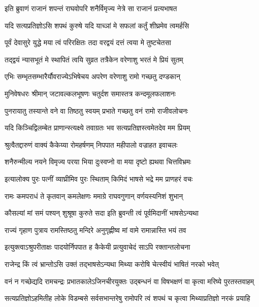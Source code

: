 \twolineshloka
{इति ब्रुवाणं राजानं शपन्तं राघवोपरि}
{शनैर्विमृज्य नेत्रे सा राजानं प्रत्यभाषत} %

\twolineshloka
{यदि सत्यप्रतिज्ञोऽसि शपथं कुरुषे यदि}
{याच्ञां मे सफलां कर्तुं शीघ्रमेव त्वमर्हसि} %

\twolineshloka
{पूर्वं देवासुरे युद्धे मया त्वं परिरक्षितः}
{तदा वरद्वयं दत्तं त्वया मे तुष्टचेतसा} %

\twolineshloka
{तद्द्वयं न्यासभूतं मे स्थापितं त्वयि सुव्रत}
{तत्रैकेन वरेणाशु भरतं मे प्रियं सुतम्} %

\twolineshloka
{एभिः सम्भृतसम्भारैर्यौवराज्येऽभिषेचय}
{अपरेण वरेणाशु रामो गच्छतु दण्डकान्} %

\twolineshloka
{मुनिवेषधरः श्रीमान् जटावल्कलभूषणः}
{चतुर्दश समास्तत्र कन्दमूलफलाशनः} %

\twolineshloka
{पुनरायातु तस्यान्ते वने वा तिष्ठतु स्वयम्}
{प्रभाते गच्छतु वनं रामो राजीवलोचनः} %

\twolineshloka
{यदि किञ्चिद्विलम्बेत प्राणान्स्त्यक्ष्ये तवाग्रतः}
{भव सत्यप्रतिज्ञस्त्वमेतदेव मम प्रियम्} %

\twolineshloka
{श्रुत्वैतद्दारुणं वाक्यं कैकेय्या रोमहर्षणम्}
{निपपात महीपालो वज्राहत इवाचलः} %

\twolineshloka
{शनैरुन्मील्य नयने विमृज्य परया भिया}
{दुःस्वप्नो वा मया दृष्टो ह्यथवा चित्तविभ्रमः} %

\twolineshloka
{इत्यालोक्य पुरः पत्नीं व्याघ्रीमिव पुरः स्थिताम्}
{किमिदं भाषसे भद्रे मम प्राणहरं वचः} %

\twolineshloka
{रामः कमपराधं ते कृतवान् कमलेक्षणः}
{ममाग्रे राघवगुणान् वर्णयस्यनिशं शुभान्} %

\twolineshloka
{कौसल्यां मां समं पश्यन् शुश्रूषा कुरुते सदा}
{इति ब्रुवन्ती त्वं पूर्वमिदानीं भाषसेऽन्यथा} %

\twolineshloka
{राज्यं गृहाण पुत्राय रामस्तिष्ठतु मन्दिरे}
{अनुगृह्णीष्व मां वामे रामान्नास्ति भयं तव} %

\twolineshloka
{इत्युक्त्वाऽश्रुपरीताक्षः पादयोर्निपपात ह}
{कैकेयी प्रत्युवाचेदं साऽपि रक्तान्तलोचना} %

\twolineshloka
{राजेन्द्र किं त्वं भ्रान्तोऽसि उक्तं तद्भाषसेऽन्यथा}
{मिथ्या करोषि चेत्स्वीयं भाषितं नरको भवेत्} %

\fourlineindentedshloka
{वनं न गच्छेद्यदि रामचन्द्रः}
{प्रभातकालेऽजिनचीरयुक्तः}
{उद्बन्धनं वा विषभक्षणं वा}
{कृत्वा मरिष्ये पुरतस्तवाहम्} %

\fourlineindentedshloka
{सत्यप्रतिज्ञोऽहमितीह लोके}
{विडम्बसे सर्वसभान्तरेषु}
{रामोपरि त्वं शपथं च कृत्वा}
{मिथ्याप्रतिज्ञो नरकं प्रयाहि} %

